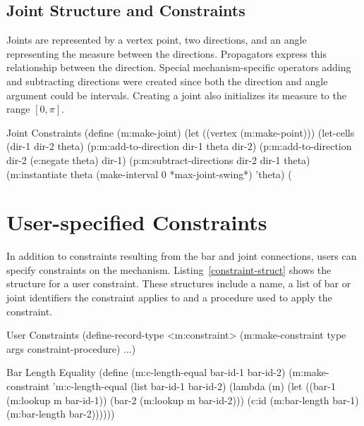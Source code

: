 \subsection{Joint Structure and Constraints}

Joints are represented by a vertex point, two directions, and an angle
representing the measure between the directions. Propagators express
this relationship between the direction. Special mechanism-specific
operators adding and subtracting directions were created since both
the direction and angle argument could be intervals. Creating
a joint also initializes its measure to the range $[0, \pi]$.

\begin{code-listing}
{Joint Constraints}
(define (m:make-joint)
  (let ((vertex (m:make-point)))
    (let-cells (dir-1 dir-2 theta)
      (p:m:add-to-direction dir-1 theta dir-2)
      (p:m:add-to-direction dir-2 (e:negate theta) dir-1)
      (p:m:subtract-directions dir-2 dir-1 theta)
      (m:instantiate theta (make-interval 0 *max-joint-swing*) 'theta)
      (%
\end{code-listing}

\enlargethispage*{\baselineskip}
\section{User-specified Constraints}

In addition to constraints resulting from the bar and joint
connections, users can specify constraints on the
mechanism. Listing~\ref{constraint-struct} shows the structure for a
user constraint. These structures include a name, a list of bar or
joint identifiers the constraint applies to and a procedure used to
apply the constraint.

\begin{code-listing}
[label=constraint-struct]
{User Constraints}
(define-record-type <m:constraint>
  (m:make-constraint type args constraint-procedure) ...)
\end{code-listing}
\begin{code-listing}
[label=bar-eq]
{Bar Length Equality}
(define (m:c-length-equal bar-id-1 bar-id-2)
  (m:make-constraint
   'm:c-length-equal
   (list bar-id-1 bar-id-2)
   (lambda (m)
     (let ((bar-1 (m:lookup m bar-id-1))
           (bar-2 (m:lookup m bar-id-2)))
       (c:id (m:bar-length bar-1)
             (m:bar-length bar-2))))))
\end{code-listing}

